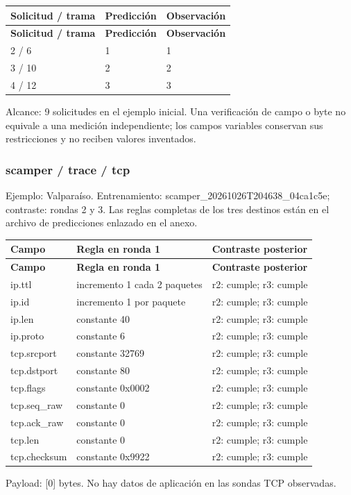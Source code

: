 \begingroup
\fontsize{9}{11}\selectfont
\addtocounter{table}{-1}
\begin{longtable}{p{3.2cm}p{5.1cm}p{5.1cm}}
\toprule
\textbf{Solicitud / trama} & \textbf{Predicción} & \textbf{Observación} \\ \midrule
\endfirsthead
\toprule
\textbf{Solicitud / trama} & \textbf{Predicción} & \textbf{Observación} \\ \midrule
\endhead
2 / 6 & 1 & 1 \\
3 / 10 & 2 & 2 \\
4 / 12 & 3 & 3 \\
\bottomrule
\end{longtable}
\endgroup
Alcance: 9 solicitudes en el ejemplo inicial. Una verificación de campo o byte no equivale a una medición independiente; los campos variables conservan sus restricciones y no reciben valores inventados.

\subsubsection{scamper / trace / tcp}
Ejemplo: Valparaíso. Entrenamiento: scamper\_\allowbreak{}20261026T204638\_\allowbreak{}04ca1c5e; contraste: rondas 2 y 3. Las reglas completas de los tres destinos están en el archivo de predicciones enlazado en el anexo.

\begingroup
\fontsize{9}{11}\selectfont
\addtocounter{table}{-1}
\begin{longtable}{p{3.1cm}p{5.8cm}p{5.1cm}}
\toprule
\textbf{Campo} & \textbf{Regla en ronda 1} & \textbf{Contraste posterior} \\ \midrule
\endfirsthead
\toprule
\textbf{Campo} & \textbf{Regla en ronda 1} & \textbf{Contraste posterior} \\ \midrule
\endhead
ip.ttl & incremento 1 cada 2 paquetes & r2: cumple; r3: cumple \\
ip.id & incremento 1 por paquete & r2: cumple; r3: cumple \\
ip.len & constante 40 & r2: cumple; r3: cumple \\
ip.proto & constante 6 & r2: cumple; r3: cumple \\
tcp.srcport & constante 32769 & r2: cumple; r3: cumple \\
tcp.dstport & constante 80 & r2: cumple; r3: cumple \\
tcp.flags & constante 0x0002 & r2: cumple; r3: cumple \\
tcp.seq\_\allowbreak{}raw & constante 0 & r2: cumple; r3: cumple \\
tcp.ack\_\allowbreak{}raw & constante 0 & r2: cumple; r3: cumple \\
tcp.len & constante 0 & r2: cumple; r3: cumple \\
tcp.checksum & constante 0x9922 & r2: cumple; r3: cumple \\
\bottomrule
\end{longtable}
\endgroup
Payload: [0] bytes. No hay datos de aplicación en las sondas TCP observadas.


